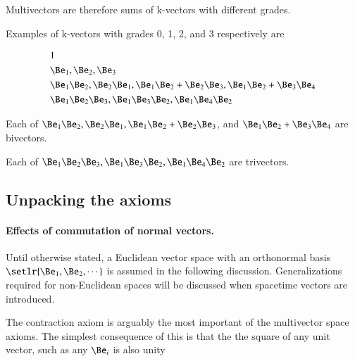 Multivectors are therefore sums of k-vectors with different grades.  

Examples of k-vectors with grades 0, 1, 2, and 3 respectively are

\begin{dmath}\label{eqn:multivector:180}
\begin{aligned}
&1 \\
&\Be_1, \Be_2, \Be_3 \\
&\Be_1 \Be_2, \Be_2 \Be_1, \Be_1 \Be_2 + \Be_2 \Be_3, \Be_1 \Be_2 + \Be_3 \Be_4 \\
&\Be_1 \Be_2 \Be_3, \Be_1 \Be_3 \Be_2, \Be_1 \Be_4 \Be_2
\end{aligned}
\end{dmath}


Each of \( \Be_1 \Be_2, \Be_2 \Be_1, \Be_1 \Be_2 + \Be_2 \Be_3 \), and \( \Be_1 \Be_2 + \Be_3 \Be_4 \) are bivectors.


Each of \( \Be_1 \Be_2 \Be_3, \Be_1 \Be_3 \Be_2, \Be_1 \Be_4 \Be_2 \) are trivectors.

\subsection{Unpacking the axioms}

\paragraph{Effects of commutation of normal vectors.}

Until otherwise stated, a Euclidean vector space with an orthonormal basis \( \setlr{\Be_1, \Be_2, \cdots } \) is assumed in the following discussion.  Generalizations required for non-Euclidean spaces will be discussed when spacetime vectors are introduced.

The contraction axiom is arguably the most important of the multivector space axioms.  The simplest consequence of this is that the 
the square of any unit vector, such as any \( \Be_i \) is also unity

